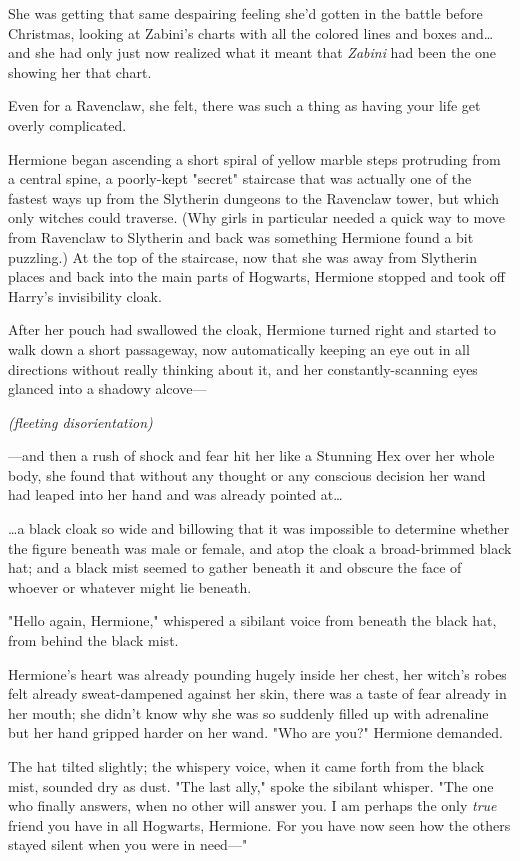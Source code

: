 She was getting that same despairing feeling she'd gotten in the battle before 
Christmas, looking at Zabini's charts with all the colored lines and boxes 
and{\ldots} and she had only just now realized what it meant that \emph{Zabini} 
had been the one showing her that chart.

Even for a Ravenclaw, she felt, there was such a thing as having your life get 
overly complicated.

Hermione began ascending a short spiral of yellow marble steps protruding from 
a central spine, a poorly-kept "secret" staircase that was actually one of the 
fastest ways up from the Slytherin dungeons to the Ravenclaw tower, but which 
only witches could traverse. (Why girls in particular needed a quick way to 
move from Ravenclaw to Slytherin and back was something Hermione found a bit 
puzzling.) At the top of the staircase, now that she was away from Slytherin 
places and back into the main parts of Hogwarts, Hermione stopped and took off 
Harry's invisibility cloak.

After her pouch had swallowed the cloak, Hermione turned right and started to 
walk down a short passageway, now automatically keeping an eye out in all 
directions without really thinking about it, and her constantly-scanning eyes 
glanced into a shadowy alcove---

\emph{(fleeting disorientation)}

---and then a rush of shock and fear hit her like a Stunning Hex over her whole 
body, she found that without any thought or any conscious decision her wand had 
leaped into her hand and was already pointed at{\ldots}

{\ldots}a black cloak so wide and billowing that it was impossible to determine 
whether the figure beneath was male or female, and atop the cloak a 
broad-brimmed black hat; and a black mist seemed to gather beneath it and 
obscure the face of whoever or whatever might lie beneath.

"Hello again, Hermione," whispered a sibilant voice from beneath the black hat, 
from behind the black mist.

Hermione's heart was already pounding hugely inside her chest, her witch's 
robes felt already sweat-dampened against her skin, there was a taste of fear 
already in her mouth; she didn't know why she was so suddenly filled up with 
adrenaline but her hand gripped harder on her wand. "Who are you?" Hermione 
demanded.

The hat tilted slightly; the whispery voice, when it came forth from the black 
mist, sounded dry as dust. "The last ally," spoke the sibilant whisper. "The 
one who finally answers, when no other will answer you. I am perhaps the only 
\emph{true} friend you have in all Hogwarts, Hermione. For you have now seen 
how the others stayed silent when you were in need---"

